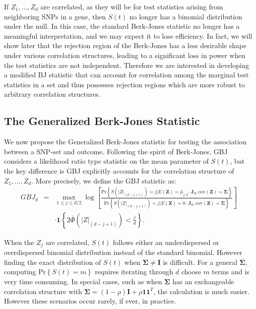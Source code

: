 \documentclass[12pt]{article}
\begin{document}
If $Z_{1},...,Z_{d}$ are correlated, as they will be for test statistics arising from neighboring 
SNPs in a gene, then $S(t)$ no longer has a binomial distribution under the null. 
In this case, the standard Berk-Jones statistic no longer has a meaningful interpretation, 
and we may expect it to lose efficiency. 
In fact, we will show later that the rejection region of the Berk-Jones has a less desirable 
shape under various correlation structures, leading to a significant loss in power when 
the test statistics are not independent. 
Therefore we are interested in developing a modified BJ statistic that can account for 
correlation among the marginal test statistics in a set and thus possesses rejection regions 
which are more robust to arbitrary correlation structures. 

\subsection{The Generalized Berk-Jones Statistic}
\label{p2_ss:GBJ}


We now propose the Generalized Berk-Jones statistic for testing the association between 
a SNP-set and outcome.   
Following the spirit of Berk-Jones, GBJ considers a likelihood ratio type statistic on 
the  mean parameter of $S(t)$, but the key difference is GBJ explicitly accounts for the 
correlation  structure of $Z_{1},...,Z_{d}$. 
More precisely, we define the GBJ statistic as:
\begin{eqnarray*}
GBJ_{d}&=&\max_{1\leq j\leq d/2 }\log\left[\frac{\text{Pr}\left\{ S\left(|Z|_{(d-j+1)}\right)=j\bigg| E(\mathbf{Z})=\widehat{\mu}_{j,d} \cdot \mathbf{J}_{d},\text{cov}(\mathbf{Z})=\boldsymbol{\Sigma}\right\} }{\text{Pr}\left\{ S\left(|Z|_{(d-j+1)}\right)=j\bigg| E(\mathbf{Z})=0 \cdot \mathbf{J}_{d},\text{cov}(\mathbf{Z})=\boldsymbol{\Sigma}\right\} }\right] \\
 & & \cdot \mathbf{1}\left\{2\bar{\Phi}\left(|Z|_{(d-j+1)}\right)<\frac{j}{d}\right\}. 
\end{eqnarray*} 

When the $Z_j$ are correlated, $S(t)$ follows either an underdispersed or overdispersed binomial distribution 
instead of the standard binomial. 
However finding the exact distribution of $S(t)$ when $\boldsymbol{\Sigma}\neq\mathbf{I}$ 
is difficult.
For a general $\boldsymbol{\Sigma}$, computing $\text{Pr}\left\{S(t)=m\right\}$ requires 
iterating through $d$ choose $m$ terms and is very time consuming. 
In special cases, such as when $\boldsymbol{\Sigma}$ has an exchangeable correlation 
structure with $\boldsymbol{\Sigma}=(1-\rho)\mathbf{I} + \rho\mathbf{1}\mathbf{1}^{T}$, 
the calculation is much easier. 
However these scenarios occur rarely, if ever, in practice. 
\end{document}
